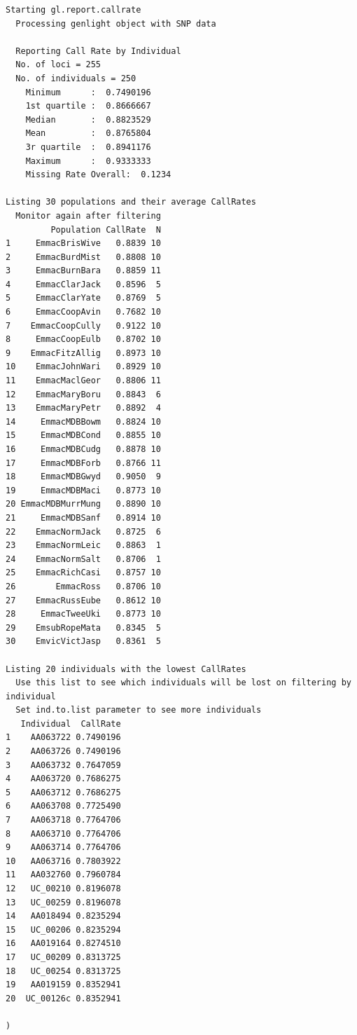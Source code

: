 \documentclass[
  letterpaper,
  DIV=11,
  numbers=noendperiod]{scrreprt}
\let\textttOrig\texttt
\renewcommand{\texttt}[1]{\textttOrig{\color{blue}{#1}}}
\begin{document}
\begin{verbatim}
Starting gl.report.callrate 
  Processing genlight object with SNP data

  Reporting Call Rate by Individual
  No. of loci = 255 
  No. of individuals = 250 
    Minimum      :  0.7490196 
    1st quartile :  0.8666667 
    Median       :  0.8823529 
    Mean         :  0.8765804 
    3r quartile  :  0.8941176 
    Maximum      :  0.9333333 
    Missing Rate Overall:  0.1234 

Listing 30 populations and their average CallRates
  Monitor again after filtering
         Population CallRate  N
1     EmmacBrisWive   0.8839 10
2     EmmacBurdMist   0.8808 10
3     EmmacBurnBara   0.8859 11
4     EmmacClarJack   0.8596  5
5     EmmacClarYate   0.8769  5
6     EmmacCoopAvin   0.7682 10
7    EmmacCoopCully   0.9122 10
8     EmmacCoopEulb   0.8702 10
9    EmmacFitzAllig   0.8973 10
10    EmmacJohnWari   0.8929 10
11    EmmacMaclGeor   0.8806 11
12    EmmacMaryBoru   0.8843  6
13    EmmacMaryPetr   0.8892  4
14     EmmacMDBBowm   0.8824 10
15     EmmacMDBCond   0.8855 10
16     EmmacMDBCudg   0.8878 10
17     EmmacMDBForb   0.8766 11
18     EmmacMDBGwyd   0.9050  9
19     EmmacMDBMaci   0.8773 10
20 EmmacMDBMurrMung   0.8890 10
21     EmmacMDBSanf   0.8914 10
22    EmmacNormJack   0.8725  6
23    EmmacNormLeic   0.8863  1
24    EmmacNormSalt   0.8706  1
25    EmmacRichCasi   0.8757 10
26        EmmacRoss   0.8706 10
27    EmmacRussEube   0.8612 10
28     EmmacTweeUki   0.8773 10
29    EmsubRopeMata   0.8345  5
30    EmvicVictJasp   0.8361  5

Listing 20 individuals with the lowest CallRates
  Use this list to see which individuals will be lost on filtering by individual
  Set ind.to.list parameter to see more individuals
   Individual  CallRate
1    AA063722 0.7490196
2    AA063726 0.7490196
3    AA063732 0.7647059
4    AA063720 0.7686275
5    AA063712 0.7686275
6    AA063708 0.7725490
7    AA063718 0.7764706
8    AA063710 0.7764706
9    AA063714 0.7764706
10   AA063716 0.7803922
11   AA032760 0.7960784
12   UC_00210 0.8196078
13   UC_00259 0.8196078
14   AA018494 0.8235294
15   UC_00206 0.8235294
16   AA019164 0.8274510
17   UC_00209 0.8313725
18   UC_00254 0.8313725
19   AA019159 0.8352941
20  UC_00126c 0.8352941

)
\end{verbatim}

\begin{figure}[H]

{\centering \texttt{[image: basicfiltering\_files/figure-pdf/unnamed-chunk-6-1.pdf]}

}

\end{figure}
\end{document}
